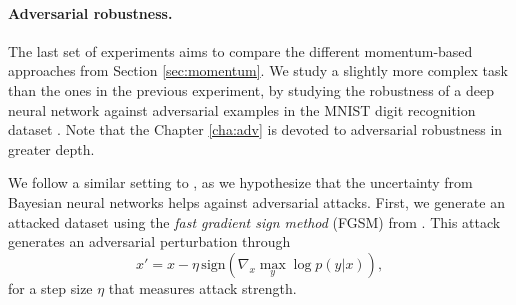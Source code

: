 \begin{table}[H]
\caption{Root Mean Squared Error results for the BNN experiments}\label{tab:bnn2}
\end{table}


\paragraph{Adversarial robustness.}

The last set of experiments aims to compare the different momentum-based approaches from Section \ref{sec:momentum}. We study a slightly more complex task than the ones in the previous experiment, by studying the robustness of a deep neural network against adversarial examples \parencite{goodfellow2014explaining} in the MNIST digit recognition dataset \parencite{MNIST}. Note that the Chapter \ref{cha:adv} is devoted to adversarial robustness in greater depth.

We follow a similar setting to \parencite{li2017dropout}, as we hypothesize that the uncertainty from Bayesian neural networks helps against adversarial attacks. First, we generate an attacked dataset using the \emph{fast gradient sign method} (FGSM) from \cite{goodfellow2014explaining}. This attack generates an adversarial perturbation through
$$
x' = x - \eta\,\mbox{sign}(\nabla_x \max_y \log p(y|x)),
$$
for a step size $\eta$ that measures attack strength.

